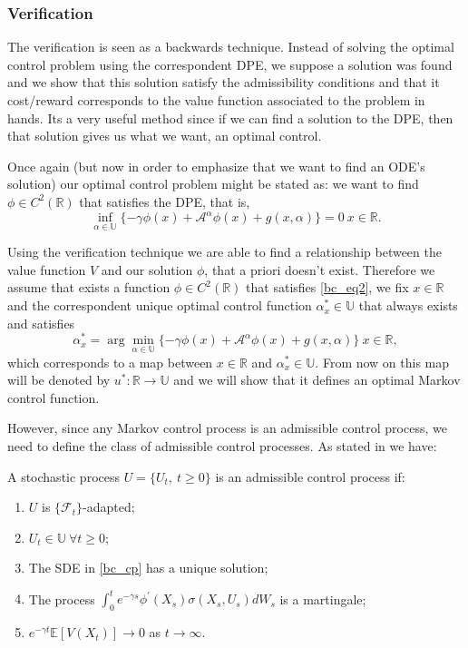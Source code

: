 \subsubsection{Verification}
 
The verification is seen as a backwards technique. Instead of solving the optimal control problem using the correspondent DPE, we suppose a solution was found and we show that this solution satisfy the admissibility conditions and that it cost/reward corresponds to the value function associated to the problem in hands. Its a very useful method since if we can find a solution to the DPE, then that solution gives us what we want, an optimal control.


Once again (but now in order to emphasize that we want to find an ODE's solution) our optimal control problem might be stated as: we want to find  $\phi \in C^2(\mathds{R})$ that satisfies the DPE, that is,
\begin{equation}
  \inf_{\alpha \in \mathds{U}} \{  - \gamma \phi(x)+\mathcal{A^\alpha}\phi(x)+g(x,\alpha) \}=0 \ x\in \mathds{R}.
  \label{bc_eq2}
\end{equation}

Using the verification technique we are able to find a relationship between the value function $V$ and our solution $\phi$, that a priori doesn't exist.
Therefore we assume that exists a function $\phi \in C^2(\mathds{R})$ that satisfies \eqref{bc_eq2}, we fix $x \in \mathds{R}$ and the correspondent unique optimal control function $\alpha_x^* \in \mathds{U}$ that always exists and satisfies
\begin{equation}
 \alpha_x^*= \arg \min_{\alpha \in \mathds{U} }  \{  - \gamma \phi(x)+\mathcal{A^\alpha}\phi(x)+g(x,\alpha) \}  \ x\in \mathds{R},
 \label{bc_a}
\end{equation}
which corresponds to a map between $x \in \mathds{R}$ and $\alpha_x^* \in \mathds{U}$. From now on this map will be denoted by $u^*: \mathds{R} \rightarrow \mathds{U}$ and we will show that it defines an optimal Markov control function.

However, since any Markov control process is an admissible control process, we need to define the class of admissible control processes. As stated in \cite{ross} we have:
\begin{defi}
	A stochastic process $U= \{ U_t, \ t \geq 0 \}$ is an admissible control process if:
	\begin{enumerate}
		\item $U$ is $\{ \mathcal{F}_t\}$-adapted;
		\item $U_t \in \mathds{U} \ \forall t \geq 0$;
		\item The SDE in \eqref{bc_cp} has a unique solution;
		\item The process $\int^t_0 e^{-\gamma s} \phi^\prime(X_s)\sigma(X_s,U_s) dW_s$ is a martingale;
		\item $e^{-\gamma t} \mathds{E}[V(X_t)] \rightarrow 0$ as $t \rightarrow \infty$. 
	\end{enumerate}
\end{defi}

